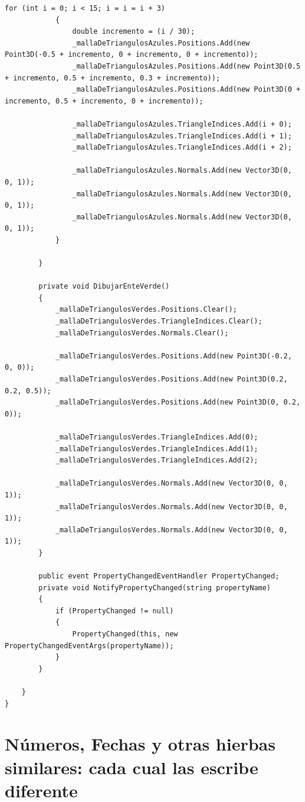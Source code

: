 \documentclass[spanish,12pt,a4paper,final,oneside]{book}
\begin{document}
\begin{lstlisting}[frame=single]
            for (int i = 0; i < 15; i = i = i + 3)
            {
            	double incremento = (i / 30);
                _mallaDeTriangulosAzules.Positions.Add(new Point3D(-0.5 + incremento, 0 + incremento, 0 + incremento));
                _mallaDeTriangulosAzules.Positions.Add(new Point3D(0.5 + incremento, 0.5 + incremento, 0.3 + incremento));
                _mallaDeTriangulosAzules.Positions.Add(new Point3D(0 + incremento, 0.5 + incremento, 0 + incremento));
 
                _mallaDeTriangulosAzules.TriangleIndices.Add(i + 0);
                _mallaDeTriangulosAzules.TriangleIndices.Add(i + 1);
                _mallaDeTriangulosAzules.TriangleIndices.Add(i + 2);
 
            	_mallaDeTriangulosAzules.Normals.Add(new Vector3D(0, 0, 1));
                _mallaDeTriangulosAzules.Normals.Add(new Vector3D(0, 0, 1));
                _mallaDeTriangulosAzules.Normals.Add(new Vector3D(0, 0, 1));
            }
 
        }
 
        private void DibujarEnteVerde()
    	{
            _mallaDeTriangulosVerdes.Positions.Clear();
            _mallaDeTriangulosVerdes.TriangleIndices.Clear();
            _mallaDeTriangulosVerdes.Normals.Clear();
 
            _mallaDeTriangulosVerdes.Positions.Add(new Point3D(-0.2, 0, 0));
            _mallaDeTriangulosVerdes.Positions.Add(new Point3D(0.2, 0.2, 0.5));
            _mallaDeTriangulosVerdes.Positions.Add(new Point3D(0, 0.2, 0));
 
            _mallaDeTriangulosVerdes.TriangleIndices.Add(0);
            _mallaDeTriangulosVerdes.TriangleIndices.Add(1);
            _mallaDeTriangulosVerdes.TriangleIndices.Add(2);
 
            _mallaDeTriangulosVerdes.Normals.Add(new Vector3D(0, 0, 1));
            _mallaDeTriangulosVerdes.Normals.Add(new Vector3D(0, 0, 1));
            _mallaDeTriangulosVerdes.Normals.Add(new Vector3D(0, 0, 1));
        }
 
        public event PropertyChangedEventHandler PropertyChanged;
        private void NotifyPropertyChanged(string propertyName)
        {
            if (PropertyChanged != null)
            {
            	PropertyChanged(this, new PropertyChangedEventArgs(propertyName));
            }
    	}
 
	}
}
\end{lstlisting}

\section{Números, Fechas y otras hierbas similares: cada cual las escribe diferente}
\end{document}
